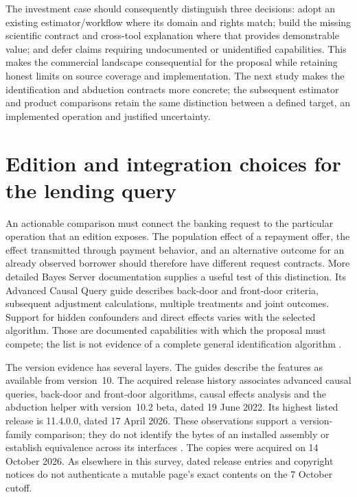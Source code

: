 The investment case should consequently distinguish three decisions: adopt
an existing estimator/workflow where its domain and rights match; build the
missing scientific contract and cross-tool explanation where that provides
demonstrable value; and defer claims requiring undocumented or unidentified
capabilities. This makes the commercial landscape consequential for the
proposal while retaining honest limits on source coverage and implementation.
The next study makes the identification and abduction contracts more concrete;
the subsequent estimator and product comparisons retain the same distinction
between a defined target, an implemented operation and justified uncertainty.
\label{exec13:commercial-identification-end}


\section{Edition and integration choices for the lending query}
\label{exec14:commercial-contracts}

An actionable comparison must connect the banking request to the particular
operation that an edition exposes. The population effect of a repayment offer,
the effect transmitted through payment behavior, and an alternative outcome
for an already observed borrower should therefore have different request
contracts. More detailed Bayes Server documentation supplies a useful test of
this distinction. Its Advanced Causal Query guide describes back-door and
front-door criteria, subsequent adjustment calculations, multiple treatments
and joint outcomes. Support for hidden confounders and direct effects varies
with the selected algorithm. Those are documented capabilities with which the
proposal must compete; the list is not evidence of a complete general
identification algorithm \citep{exec14_ci_causal_query}.

The version evidence has several layers. The guides describe the features as
available from version~10. The acquired release history associates advanced
causal queries, back-door and front-door algorithms, causal effects analysis
and the abduction helper with version~10.2 beta, dated 19 June 2022. Its highest
listed release is 11.4.0.0, dated 17 April 2026. These observations support a
version-family comparison; they do not identify the bytes of an installed
assembly or establish equivalence across its interfaces
\citep{exec14_ci_release_history}. The copies were acquired on 14 October
2026. As elsewhere in this survey, dated release entries and copyright notices
do not authenticate a mutable page's exact contents on the 7 October cutoff.

